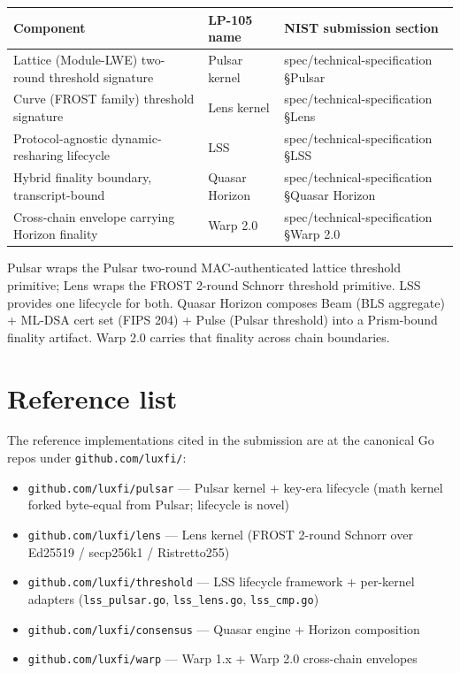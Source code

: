 \documentclass[11pt]{article}
\begin{document}
\begin{longtable}{p{}p{}p{}}
\toprule
\textbf{Component} & \textbf{LP-105 name} & \textbf{NIST submission section} \\
\midrule
Lattice (Module-LWE) two-round threshold signature & Pulsar kernel & spec/technical-specification \S Pulsar \\
Curve (FROST family) threshold signature & Lens kernel & spec/technical-specification \S Lens \\
Protocol-agnostic dynamic-resharing lifecycle & LSS & spec/technical-specification \S LSS \\
Hybrid finality boundary, transcript-bound & Quasar Horizon & spec/technical-specification \S Quasar Horizon \\
Cross-chain envelope carrying Horizon finality & Warp 2.0 & spec/technical-specification \S Warp 2.0 \\
\bottomrule
\end{longtable}

Pulsar wraps the Pulsar two-round MAC-authenticated lattice threshold
primitive; Lens wraps the FROST 2-round Schnorr threshold primitive. LSS
provides one lifecycle for both. Quasar Horizon composes Beam (BLS aggregate)
+ ML-DSA cert set (FIPS 204) + Pulse (Pulsar threshold) into a Prism-bound
finality artifact. Warp 2.0 carries that finality across chain boundaries.

\section*{Reference list}

The reference implementations cited in the submission are at the canonical
Go repos under \verb|github.com/luxfi/|:

\begin{itemize}[leftmargin=*]
\item \verb|github.com/luxfi/pulsar| --- Pulsar kernel + key-era lifecycle
  (math kernel forked byte-equal from Pulsar; lifecycle is novel)
\item \verb|github.com/luxfi/lens| --- Lens kernel
  (FROST 2-round Schnorr over Ed25519 / secp256k1 / Ristretto255)
\item \verb|github.com/luxfi/threshold| --- LSS lifecycle framework
  + per-kernel adapters (\verb|lss_pulsar.go|, \verb|lss_lens.go|, \verb|lss_cmp.go|)
\item \verb|github.com/luxfi/consensus| --- Quasar engine + Horizon composition
\item \verb|github.com/luxfi/warp| --- Warp 1.x + Warp 2.0 cross-chain envelopes
\end{itemize}
\end{document}
